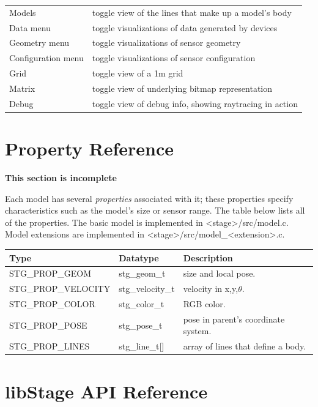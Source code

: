 \documentclass[letter,11pt,twoside]{report}
\begin{document}
\begin{tabular}{|l|l|}
\hline 
Models & toggle view of the lines that make up a model's body\\
Data menu & toggle visualizations of data generated by devices\\
Geometry menu & toggle visualizations of sensor geometry\\
Configuration menu & toggle visualizations of sensor configuration\\
Grid & toggle view of a 1m grid\\
Matrix & toggle view of underlying bitmap representation\\
Debug & toggle view of debug info, showing raytracing in action\\
\hline
\end{tabular}



\chapter{Property Reference}

{\bf This section is incomplete}

Each model has several {\em properties} associated with it; these
properties specify characteristics such as the model's size or sensor
range. The table below lists all of the properties.  The basic
model is implemented in <stage>/src/model.c. Model extensions are
implemented in <stage>/src/model\_<extension>.c.
\vspace{1em}\\
\noindent
\begin{tabularx}{\columnwidth}{lll}
\hline 
Type & Datatype & Description \\
\hline 
STG\_PROP\_GEOM & stg\_geom\_t & size and local pose. \\ 
STG\_PROP\_VELOCITY & stg\_velocity\_t & velocity in x,y,$\theta$. \\
STG\_PROP\_COLOR & stg\_color\_t & RGB color. \\
STG\_PROP\_POSE & stg\_pose\_t & pose in parent's coordinate system. \\
STG\_PROP\_LINES & stg\_line\_t[] & array of lines that define a body. \\

\hline
\end{tabularx}


\chapter{libStage API Reference}
\end{document}
